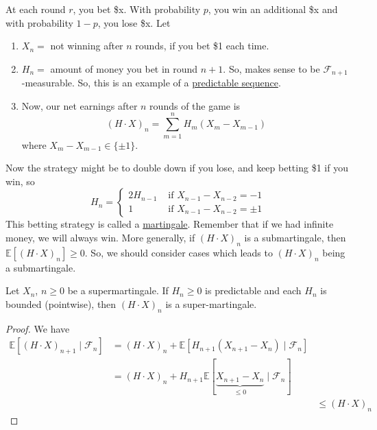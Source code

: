	\begin{example}[Gambling]
	  \label{ex:gambling}
	  At each round $r$, you bet \$x. With probability $p$, you win an additional \$x and with probability $1-p$, you lose \$x. Let 
		\begin{enumerate}
		  \item $X_n = $ not winning after $n$ rounds, if you bet \$1 each time. 
			\item $H_n = $ amount of money you bet in round $n+1$. So, makes sense to be $\mathscr{F}_{n+1}$-measurable. So, this is an example of a \hyperref[def:predictable-sequence]{predictable sequence}. 
			\item Now, our net earnings after $n$ rounds of the game is 
				\begin{equation}
					(H \cdot X)_n = \sum_{m=1}^n H_m (X_m - X_{m-1})
				\end{equation}
				where $X_m - X_{m-1} \in \{\pm 1\}$. 
		\end{enumerate}
		Now the strategy might be to double down if you lose, and keep betting \$1 if you win, so 
		\begin{equation}
			H_n = \begin{cases} 
				2 H_{n-1} & \text{ if } X_{n-1} - X_{n-2} = -1 \\ 
				1 & \text{ if } X_{n-1} - X_{n-2} = \pm 1
			\end{cases} 
		\end{equation}
		This betting strategy is called a \hyperref[def:martingale]{martingale}. Remember that if we had infinite money, we will always win. More generally, if $(H \cdot X)_n$ is a submartingale, then $\mathbb{E}[(H \cdot X)_n] \geq 0$. So, we should consider cases which leads to $(H \cdot X)_n$ being a submartingale. 
	\end{example}

	\begin{theorem}
	  \label{thm:discrete-stochastic-integral-of-a}
		Let $X_n$, $n \geq 0$ be a supermartingale. If $H_n \geq 0$ is predictable and each $H_n$ is bounded (pointwise), then $(H \cdot X)_n$ is a super-martingale. 
	\end{theorem}
	\begin{proof}
	  We have 
		\begin{align}
			\mathbb{E}[(H \cdot X)_{n+1} \mid \mathscr{F}_n] & = (H \cdot X)_n + \mathbb{E}[H_{n+1} (X_{n+1} - X_n) \mid \mathscr{F}_n ] \\ 
																											 & = (H \cdot X)_n + H_{n+1} \mathbb{E}[\underbrace{X_{n+1} - X_n}_{\leq 0} \mid \mathscr{F}_n ] \\ &
																											& \leq (H \cdot X)_n 
		\end{align}
	\end{proof}


